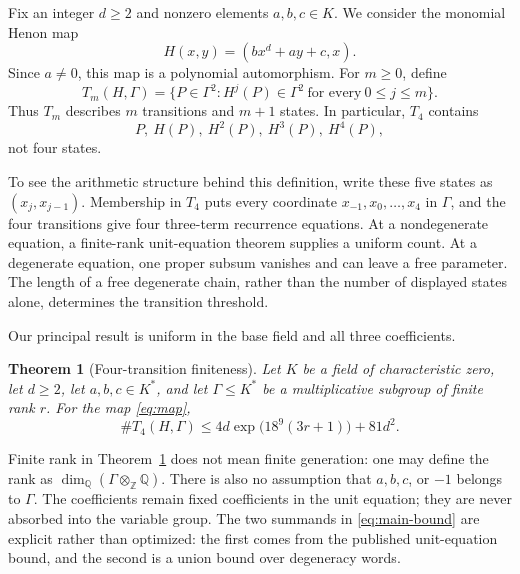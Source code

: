 \documentclass[11pt]{article}
\newtheorem{theorem}{Theorem}[section]
\theoremstyle{definition}
\theoremstyle{remark}
\begin{document}
Fix an integer \(d\ge2\) and nonzero elements \(a,b,c\in K\).  We consider
the monomial Henon map
\begin{equation}\label{eq:map}
 H(x,y)=(b x^d+a y+c,x).
\end{equation}
Since \(a\ne0\), this map is a polynomial automorphism.  For \(m\ge0\), define
\begin{equation}\label{eq:Tm}
 T_m(H,\Gamma)
 =
 \bigl\{P\in\Gamma^2:
 H^j(P)\in\Gamma^2\ \text{for every}\ 0\le j\le m\bigr\}.
\end{equation}
Thus \(T_m\) describes \(m\) transitions and \(m+1\) states.  In particular,
\(T_4\) contains
\[
 P,\ H(P),\ H^2(P),\ H^3(P),\ H^4(P),
\]
not four states.

To see the arithmetic structure behind this definition, write these five
states as \((x_j,x_{j-1})\).  Membership in \(T_4\) puts every coordinate
\(x_{-1},x_0,\ldots,x_4\) in \(\Gamma\), and the four transitions give four
three-term recurrence equations.  At a nondegenerate equation, a
finite-rank unit-equation theorem supplies a uniform count.  At a degenerate
equation, one proper subsum vanishes and can leave a free parameter.  The
length of a free degenerate chain, rather than the number of displayed
states alone, determines the transition threshold.

Our principal result is uniform in the base field and all three
coefficients.

\begin{theorem}[Four-transition finiteness]\label{thm:four-step}
Let \(K\) be a field of characteristic zero, let \(d\ge2\), let
\(a,b,c\in K^\ast\), and let \(\Gamma\le K^\ast\) be a multiplicative
subgroup of finite rank \(r\).  For the map \eqref{eq:map},
\begin{equation}\label{eq:main-bound}
 \#T_4(H,\Gamma)
 \le
 4d\exp\!\bigl(18^9(3r+1)\bigr)+81d^2.
\end{equation}
\end{theorem}

Finite rank in Theorem~\ref{thm:four-step} does not mean finite generation:
one may define the rank as
\(\dim_{\mathbb Q}(\Gamma\otimes_{\mathbb Z}\mathbb Q)\).
There is also no assumption that \(a,b,c\), or \(-1\) belongs to
\(\Gamma\).  The coefficients remain fixed coefficients in the unit
equation; they are never absorbed into the variable group.  The two
summands in \eqref{eq:main-bound} are explicit rather than optimized: the
first comes from the published unit-equation bound, and the second is a
union bound over degeneracy words.
\end{document}
